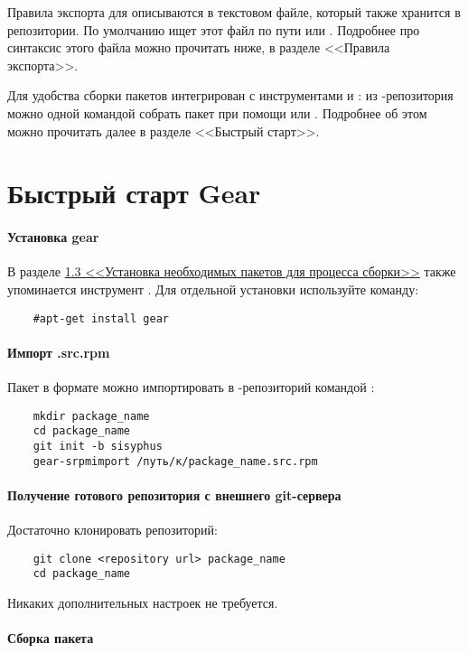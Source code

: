 Правила экспорта для  описываются в текстовом файле, который также хранится в репозитории. По умолчанию  ищет этот файл по пути  или . Подробнее про синтаксис этого файла можно прочитать ниже, в разделе <<Правила экспорта>>.

Для удобства сборки пакетов  интегрирован с инструментами  и : из -репозитория можно одной командой собрать пакет при помощи  или . Подробнее об этом можно прочитать далее в разделе <<Быстрый старт>>. 


\section{Быстрый старт Gear}
\paragraph{Установка gear}

В разделе \hyperlink{1.3}{1.3 <<Установка необходимых пакетов для процесса сборки>>} также упоминается инструмент . Для отдельной установки используйте команду: 
\begin{verbatim}
	#apt-get install gear
\end{verbatim}

\paragraph{Импорт .src.rpm }

Пакет в формате  можно импортировать в -репозиторий командой :
\begin{verbatim}
	mkdir package_name
	cd package_name
	git init -b sisyphus
	gear-srpmimport /путь/к/package_name.src.rpm
\end{verbatim}

\paragraph{Получение готового репозитория с внешнего git-сервера}

Достаточно клонировать репозиторий: 
\begin{verbatim}
	git clone <repository url> package_name
	cd package_name
\end{verbatim}

Никаких дополнительных настроек не требуется.

\paragraph{Сборка пакета}


